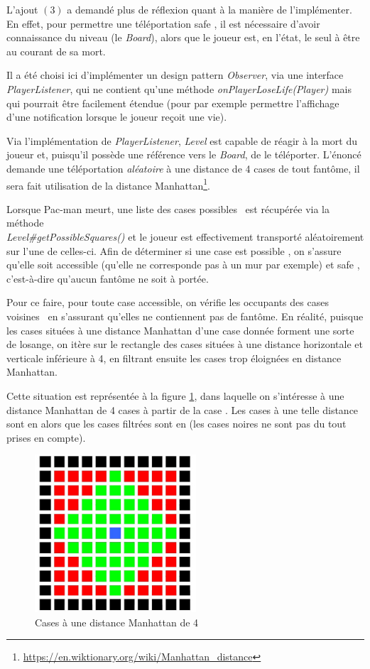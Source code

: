 \documentclass[12pt, openany]{report}
\begin{document}
L'ajout $(3)$ a demandé plus de réflexion quant à la manière de l'implémenter. En effet, pour permettre une téléportation \og safe \fg , il est nécessaire d'avoir connaissance du niveau (le \mbox{\textit{Board}}), alors que le joueur est, en l'état, le seul à être au courant de sa mort.

Il a été choisi ici d'implémenter un design pattern \mbox{\textit{Observer}}, via une interface \mbox{\textit{PlayerListener}}, qui ne contient qu'une méthode \mbox{\textit{onPlayerLoseLife(Player)}} mais qui pourrait être facilement étendue (pour par exemple permettre l'affichage d'une notification lorsque le joueur reçoit une vie).

Via l'implémentation de \mbox{\textit{PlayerListener}}, \mbox{\textit{Level}} est capable de réagir à la mort du joueur et, puisqu'il possède une référence vers le \mbox{\textit{Board}}, de le téléporter. L'énoncé demande une téléportation \textit{aléatoire} à une distance de 4 cases de tout fantôme, il sera fait utilisation de la distance Manhattan\footnote{\url{https://en.wiktionary.org/wiki/Manhattan_distance}}.

Lorsque Pac-man meurt, une liste des cases \og possibles \fg \, est récupérée via la méthode\\
 \mbox{\textit{Level\#getPossibleSquares()}} et le joueur est effectivement transporté aléatoirement sur l'une de celles-ci. Afin de déterminer si une case est \og possible \fg , on s'assure qu'elle soit accessible (qu'elle ne corresponde pas à un mur par exemple) et \og safe \fg , c'est-à-dire qu'aucun fantôme ne soit à portée.

Pour ce faire, pour toute case accessible, on vérifie les occupants des cases \og voisines \fg \, en s'assurant qu'elles ne contiennent pas de fantôme. En réalité, puisque les cases situées à une distance Manhattan d'une case donnée forment une sorte de losange, on itère sur le rectangle des cases situées à une distance horizontale et verticale inférieure à 4, en filtrant ensuite les cases trop éloignées en distance Manhattan. 

Cette situation est représentée à la figure \ref{manhattan}, dans laquelle on s'intéresse à une distance Manhattan de 4 cases à partir de la case {\color{blue}{bleue}}. Les cases à une telle distance sont en {\color{green}{vert}} alors que les cases filtrées sont en {\color{red}{rouge}} (les cases noires ne sont pas du tout prises en compte).
\begin{figure}[h]
	\centering
	\includegraphics[width=6cm]{Images/manhattan.jpg}
	\caption{\label{manhattan} Cases à une distance Manhattan de 4}
\end{figure}
\end{document}
